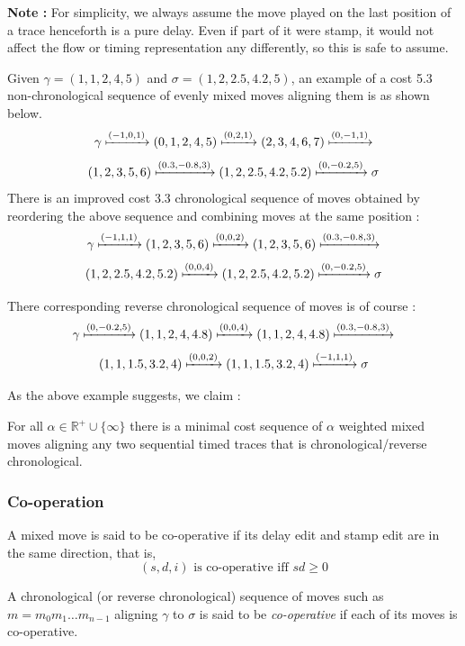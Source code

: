 \documentclass[runningheads]{llncs}
\begin{document}
	\textbf{Note : } For simplicity, we always assume the move played on the last position of a trace henceforth is a pure delay. Even if part of it were stamp, it would not affect the flow or timing representation any differently, so this is safe to assume. 
	
	\begin{example}
		
		Given $\gamma = (1, 1, 2, 4, 5)$ and $\sigma = (1, 2, 2.5, 4.2, 5)$, an example of a cost 5.3 non-chronological sequence of evenly mixed moves aligning them is as shown below. 
		$$\gamma \xmapsto{(-1, 0, 1)} (0, 1, 2, 4, 5) \xmapsto{(0, 2, 1)} (2, 3, 4, 6, 7) \xmapsto{(0, -1, 1)} $$
		$$(1, 2, 3, 5, 6) \xmapsto{(0.3, -0.8, 3)} (1, 2, 2.5, 4.2, 5.2) \xmapsto{(0, -0.2, 5)} \sigma$$
		There is an improved cost 3.3 chronological sequence of moves obtained by reordering the above sequence and combining moves at the same position : 
		$$\gamma \xmapsto{(-1, 1, 1)} (1, 2, 3, 5, 6) \xmapsto{(0, 0, 2)} (1, 2, 3, 5, 6) \xmapsto{(0.3, -0.8, 3)}  $$
		$$ (1, 2, 2.5, 4.2, 5.2) \xmapsto{(0, 0, 4)} (1, 2, 2.5, 4.2, 5.2) \xmapsto{(0, -0.2, 5)} \sigma $$
		
		There corresponding reverse chronological sequence of moves is of course : 
		$$\gamma \xmapsto{(0, -0.2, 5)} (1, 1, 2, 4, 4.8) \xmapsto{(0, 0, 4)} (1, 1, 2, 4, 4.8) \xmapsto{(0.3, -0.8, 3)} $$
		$$(1, 1, 1.5, 3.2, 4)\xmapsto{(0, 0, 2)} (1, 1, 1.5, 3.2, 4)\xmapsto{(-1, 1, 1)} \sigma $$
		
	\end{example}
	
	As the above example suggests, we claim : 
	
	\begin{lemma}\label{linescommute} For all $\alpha \in \mathbb{R}^+ \cup \{\infty\}$ there is a minimal cost sequence of $\alpha$ weighted mixed moves aligning any two sequential timed traces that is chronological/reverse chronological. 
	\end{lemma}
	
	\subsubsection{Co-operation}
	
	\begin{definition}[Co-operation]
		A mixed move is said to be co-operative if its delay edit and stamp edit are in the same direction, that is, 
		$$(s, d, i) \textrm{ is co-operative iff } sd \geq 0$$
		
		A chronological (or reverse chronological) sequence of moves such as $m = m_0m_1\dots m_{n-1}$ aligning $\gamma$ to $\sigma$ is said to be \textit{co-operative} if each of its moves is co-operative. 
	\end{definition}
	
\end{document}
